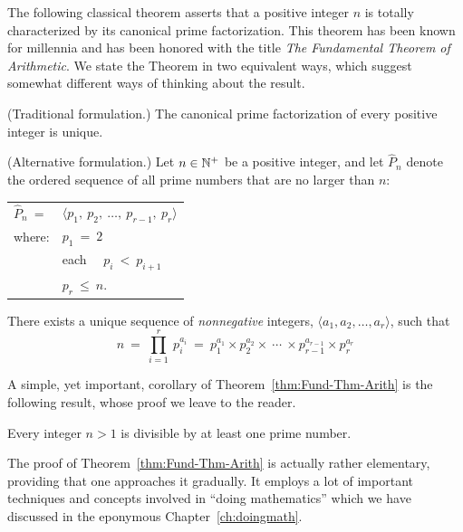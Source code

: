 \medskip

The following classical theorem asserts that a positive integer $n$ is totally characterized by its canonical prime factorization.  This theorem has been known for millennia and has been honored with the title {\em The Fundamental Theorem of Arithmetic}.  We state the Theorem in two equivalent ways, which suggest somewhat different ways of thinking about the result.

\begin{theorem}
\label{thm:Fund-Thm-Arith}

\noindent
{\rm (Traditional formulation.)}
%
The canonical prime factorization of every positive integer is unique.

\medskip

\noindent
{\rm (Alternative formulation.)}
%
Let $n \in \mathbb{N}^+$ be a positive integer, and let $\widehat{P}_n$ denote the ordered sequence of all prime numbers that are no larger than $n$:

\smallskip

\begin{tabular}{ll}
$\widehat{P}_n \ =$  & $\langle p_1, \ p_2, \ \ldots, \ p_{r-1}, \ p_r \rangle$ \\
where:               & $p_1 \ = \ 2$ \\
                          & each  \ \ $p_i \ < \ p_{i+1}$ \\
                          & $p_r \ \leq \ n$.
\end{tabular}

\smallskip

\noindent
There exists a unique sequence of {\em nonnegative} integers, $\langle a_1, a_2, \ldots, a_r \rangle$, such that
\[
n \ = \ \prod_{i=1}^r \ p_i^{a_i} \ = \
p_1^{a_1} \times p_2^{a_2} \times \ \cdots \ \times p_{r-1}^{a_{r-1}} \times p_r^{a_r}
\]
\end{theorem}

A simple, yet important, corollary of Theorem~\ref{thm:Fund-Thm-Arith} is the following result, whose proof we leave to the reader.

\begin{prop}
\label{thm:prime-divisor}
Every integer $n>1$ is divisible by at least one prime number.
\end{prop}

\medskip

The proof of Theorem~\ref{thm:Fund-Thm-Arith} is actually rather elementary, providing that one approaches it gradually.  It employs a lot of important techniques and concepts involved in ``doing mathematics'' which we have discussed in the eponymous Chapter~\ref{ch:doingmath}.

